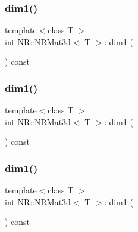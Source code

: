 \subsubsection{\texorpdfstring{dim1()}{dim1()}\hspace{0.1cm}{\footnotesize\ttfamily [1/3]}}
{\footnotesize\ttfamily template$<$class T $>$ \\
int \mbox{\hyperlink{classNR_1_1NRMat3d}{N\+R\+::\+N\+R\+Mat3d}}$<$ T $>$\+::dim1 (\begin{DoxyParamCaption}{ }\end{DoxyParamCaption}) const\hspace{0.3cm}{\ttfamily [inline]}}

\mbox{\label{classNR_1_1NRMat3d_ae46651c069e6954e03e5d3a39ffd2891}} 
\subsubsection{\texorpdfstring{dim1()}{dim1()}\hspace{0.1cm}{\footnotesize\ttfamily [2/3]}}
{\footnotesize\ttfamily template$<$class T $>$ \\
int \mbox{\hyperlink{classNR_1_1NRMat3d}{N\+R\+::\+N\+R\+Mat3d}}$<$ T $>$\+::dim1 (\begin{DoxyParamCaption}{ }\end{DoxyParamCaption}) const\hspace{0.3cm}{\ttfamily [inline]}}

\mbox{\label{classNR_1_1NRMat3d_ae46651c069e6954e03e5d3a39ffd2891}} 
\subsubsection{\texorpdfstring{dim1()}{dim1()}\hspace{0.1cm}{\footnotesize\ttfamily [3/3]}}
{\footnotesize\ttfamily template$<$class T $>$ \\
int \mbox{\hyperlink{classNR_1_1NRMat3d}{N\+R\+::\+N\+R\+Mat3d}}$<$ T $>$\+::dim1 (\begin{DoxyParamCaption}{ }\end{DoxyParamCaption}) const\hspace{0.3cm}{\ttfamily [inline]}}

